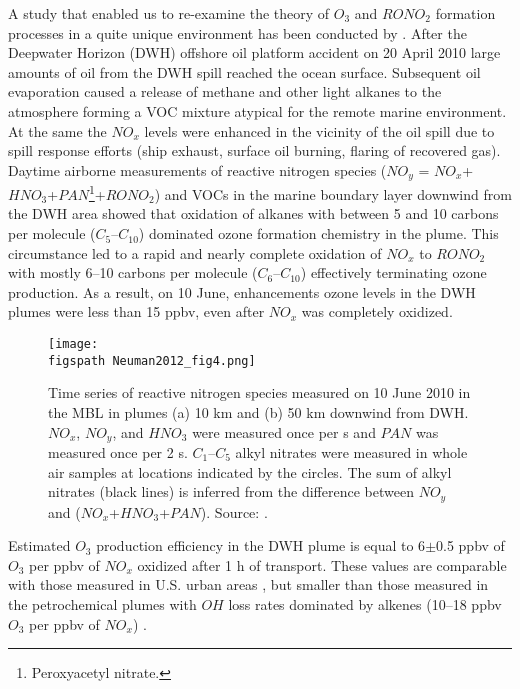 \documentclass[11pt,a4paper]{article}
\newcommand{\figspath}{figures/}
\begin{document}
A study that enabled us to re-examine the theory of $O_3$ and $RONO_2$ formation processes in a quite unique environment has been conducted by \cite{Neuman2012}. After the Deepwater Horizon (DWH) offshore oil platform accident on 20 April 2010 large amounts of oil from the DWH spill reached the ocean surface. Subsequent oil evaporation caused a release of methane and other light alkanes to the atmosphere forming a VOC mixture atypical for the remote marine environment. At the same the $NO_x$ levels were enhanced in the vicinity of the oil spill due to spill response efforts (ship exhaust, surface oil burning, flaring of recovered gas). Daytime airborne measurements of reactive nitrogen species ($NO_y$ = $NO_x$+$HNO_3$+$PAN$\footnote{Peroxyacetyl nitrate.}+$RONO_2$) and VOCs in the marine boundary layer downwind from the DWH area showed that oxidation of alkanes with between 5 and 10 carbons per molecule ($C_5$–$C_{10}$) dominated ozone formation chemistry in the plume. This circumstance led to a rapid and nearly complete oxidation of $NO_x$ to $RONO_2$ with mostly 6--10 carbons per molecule ($C_6$–$C_{10}$) effectively terminating ozone production. As a result, on 10 June, enhancements ozone levels in the DWH plumes were less than 15 ppbv, even after $NO_x$ was completely oxidized.

\begin{figure}[h!]
\centering
\texttt{[image: \\figspath Neuman2012\_fig4.png]}
\caption{Time series of reactive nitrogen species measured on 10 June 2010 in the MBL in plumes (a) 10 km and (b) 50 km downwind from DWH. $NO_x$, $NO_y$, and $HNO_3$ were measured once per s and $PAN$ was measured once per 2 s. $C_1$–$C_5$ alkyl nitrates were measured in whole air samples at locations indicated by the circles. The sum of alkyl nitrates (black lines) is inferred from the difference between $NO_y$ and ($NO_x$+$HNO_3$+$PAN$). Source: \citep{Neuman2012}.}
\label{fig:Neuman2012_fig4}
\end{figure}

Estimated $O_3$ production efficiency in the DWH plume is equal to 6$\pm$0.5 ppbv of $O_3$ per ppbv of $NO_x$ oxidized after 1 h of transport. These values are comparable with those measured in U.S. urban areas \citep{Trainer1995,Neuman2009}, but smaller than those measured in the petrochemical plumes with $OH$ loss rates dominated by alkenes (10--18 ppbv $O_3$ per ppbv of $NO_x$) \citep{Ryerson2003}.
\end{document}
